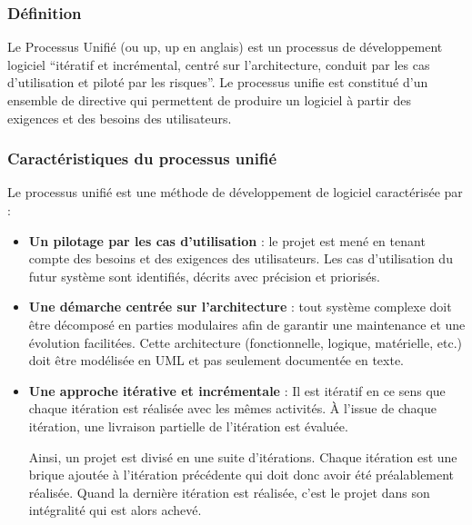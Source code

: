             \subsubsection[Définition]{Définition}    
            Le Processus Unifié (ou \acrshort{up}, \acrlong{up} en anglais) est un
            processus de développement logiciel \enquote{itératif et incrémental,
            centré sur l’architecture, conduit par les cas d’utilisation
            et piloté par les risques}. \cite*{Roques2008} Le processus unifie
            est constitué d’un ensemble de directive qui permettent de produire
            un logiciel à partir des exigences et des besoins des utilisateurs.
            \subsubsection[Caractéristiques du processus unifié]{Caractéristiques du processus unifié}
            Le processus unifié est une méthode de développement de logiciel caractérisée par :
            \par
            \begin{itemize}
                \setlength{\itemsep}{0pt}
                \item [\ding{226}] \textbf{Un pilotage par les cas d’utilisation} : le projet est mené en
                tenant compte des besoins et des exigences des utilisateurs. Les cas d’utilisation du
                futur système sont identifiés, décrits avec précision et priorisés.
                \item [\ding{226}] \textbf{Une démarche centrée sur l’architecture} : tout système
                complexe doit être décomposé en parties modulaires afin de garantir une maintenance et une
                évolution facilitées. Cette architecture (fonctionnelle, logique, matérielle, etc.)
                doit être modélisée en UML et pas seulement documentée en texte.
                \item [\ding{226}] \textbf{Une approche itérative et incrémentale} : Il est itératif en ce
                sens que chaque itération est réalisée avec les mêmes activités. À l’issue de chaque itération,
                une livraison partielle de l’itération est évaluée.
                \par\noindent
                Ainsi, un projet est divisé en une suite d’itérations. Chaque itération est une brique
                ajoutée à l’itération précédente qui doit donc avoir été préalablement réalisée.
                Quand la dernière itération est réalisée, c’est le projet dans son intégralité qui
                est alors achevé.
            \end{itemize}
